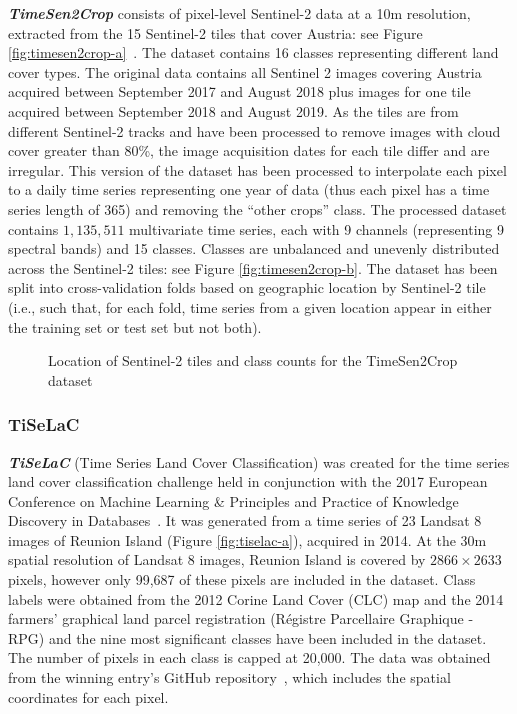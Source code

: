 \documentclass[twoside,11pt,preprint]{article}
\begin{document}
\textbf{\textit{TimeSen2Crop}} consists of pixel-level Sentinel-2 data at a 10m resolution, extracted from the 15 Sentinel-2 tiles that cover Austria: see Figure \ref{fig:timesen2crop-a}~\citep{Weikmann2021}. The dataset contains 16 classes representing different land cover types. The original data contains all Sentinel 2 images covering Austria acquired between September 2017 and August 2018 plus images for one tile acquired between September 2018 and August 2019. As the tiles are from different Sentinel-2 tracks and have been processed to remove images with cloud cover greater than 80\%, the image acquisition dates for each tile differ and are irregular. This version of the dataset has been processed to interpolate each pixel to a daily time series representing one year of data (thus each pixel has a time series length of 365) and removing the ``other crops'' class. The processed dataset contains $1{,}135{,}511$ multivariate time series, each with 9 channels (representing 9 spectral bands) and 15 classes. Classes are unbalanced and unevenly distributed across the Sentinel-2 tiles: see Figure \ref{fig:timesen2crop-b}. The dataset has been split into cross-validation folds based on geographic location by Sentinel-2 tile (i.e., such that, for each fold, time series from a given location appear in either the training set or test set but not both).

\begin{figure} %
    \centering
    \hfill%
    \caption{Location of Sentinel-2 tiles and class counts for the TimeSen2Crop dataset}
\end{figure}

\subsubsection{TiSeLaC}

\textbf{\textit{TiSeLaC}} (Time Series Land Cover Classification) was created for the time series land cover classification challenge held in conjunction with the 2017 European Conference on Machine Learning \& Principles and Practice of Knowledge Discovery in Databases~\citep{TiSeLaC2017}. It was generated from a time series of 23 Landsat 8 images of Reunion Island (Figure \ref{fig:tiselac-a}), acquired in 2014. At the 30m spatial resolution of Landsat 8 images, Reunion Island is covered by $2866 \times 2633$ pixels, however only 99,687 of these pixels are included in the dataset.
Class labels were obtained from the 2012 Corine Land Cover (CLC) map and the 2014 farmers' graphical land parcel registration (Régistre Parcellaire Graphique - RPG) and the nine most significant classes have been included in the dataset. The number of pixels in each class is capped at 20,000. The data was obtained from the winning entry's GitHub repository~\citep{DiMauro2017}, which includes the spatial coordinates for each pixel.
\end{document}
